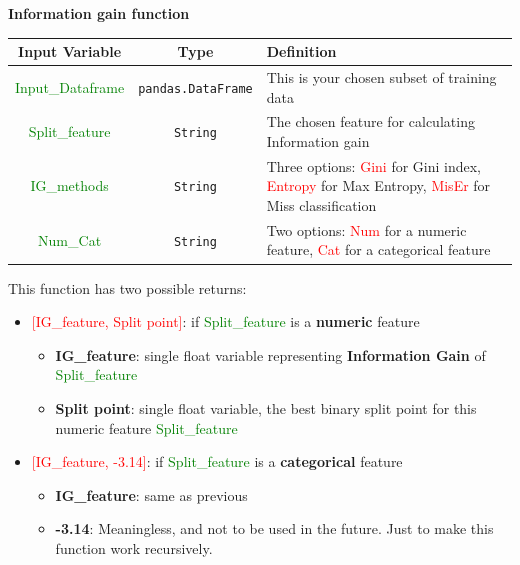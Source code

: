 \documentclass{article}
\begin{document}
\textbf{Information gain function}

\begin{center}
\begin{tabular}{|c|c|p{7cm}|}
\hline
\textbf{Input Variable} & \textbf{Type} & \textbf{Definition} \\
\hline
\textcolor{green}{Input\_Dataframe} & \texttt{pandas.DataFrame} & This is your chosen subset of training data \\
\textcolor{green}{Split\_feature} & \texttt{String} & The chosen feature for calculating Information gain \\
\textcolor{green}{IG\_methods} & \texttt{String} & Three options: \textcolor{red}{Gini} for Gini index, \textcolor{red}{Entropy} for Max Entropy, \textcolor{red}{MisEr} for Miss classification\\
\textcolor{green}{Num\_Cat} & \texttt{String} & Two options: \textcolor{red}{Num} for a numeric feature, \textcolor{red}{Cat} for a categorical feature \\
\hline
\end{tabular}
\end{center}

This function has two possible returns: 

\begin{itemize}
    \item \textcolor{red}{[IG\_feature, Split point]}: if \textcolor{green}{Split\_feature} is a \textbf{numeric} feature
        \begin{itemize}
            \item \textbf{IG\_feature}: single float variable representing \textbf{Information Gain} of \textcolor{green}{Split\_feature}
            \item \textbf{Split point}: single float variable, the best binary split point for this numeric feature \textcolor{green}{Split\_feature}
        \end{itemize}
    \item \textcolor{red}{[IG\_feature, -3.14]}: if \textcolor{green}{Split\_feature} is a \textbf{categorical} feature
        \begin{itemize}
            \item \textbf{IG\_feature}: same as previous
            \item \textbf{-3.14}: Meaningless, and not to be used in the future. Just to make this function work recursively.
        \end{itemize}
\end{itemize}
\end{document}
